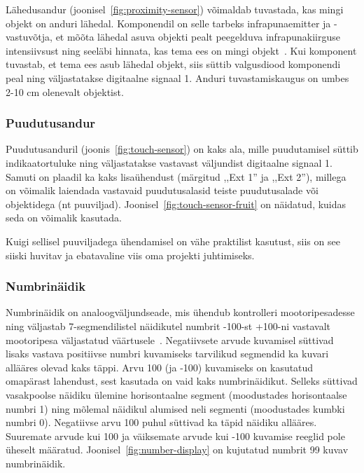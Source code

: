 \documentclass[12pt]{article}
\begin{document}
Lähedusandur (joonisel~\ref{fig:proximity-sensor}) võimaldab tuvastada, kas mingi objekt on anduri lähedal. Komponendil on selle tarbeks infrapunaemitter ja -vastuvõtja, et mõõta lähedal asuva objekti pealt peegelduva infrapunakiirguse intensiivsust ning seeläbi hinnata, kas tema ees on mingi objekt~\cite{ProximitySensorCrumbDigitalInputforCrumbleController}. Kui komponent tuvastab, et tema ees asub lähedal objekt, siis süttib valgusdiood komponendi peal ning väljastatakse digitaalne signaal 1. Anduri tuvastamiskaugus on umbes 2-10 cm olenevalt objektist.

\subsubsection{Puudutusandur}


Puudutusanduril (joonis~\ref{fig:touch-sensor}) on kaks ala, mille puudutamisel süttib indikaatortuluke ning väljastatakse vastavast väljundist digitaalne signaal 1. Samuti on plaadil ka kaks lisaühendust (märgitud ,,Ext 1'' ja ,,Ext 2''), millega on võimalik laiendada vastavaid puudutusalasid teiste puudutusalade või objektidega (nt puuviljad). Joonisel~\ref{fig:touch-sensor-fruit} on näidatud, kuidas seda on võimalik kasutada.


Kuigi sellisel puuviljadega ühendamisel on vähe praktilist kasutust, siis on see siiski huvitav ja ebatavaline viis oma projekti juhtimiseks.

\subsubsection{Numbrinäidik}


Numbrinäidik on analoogväljundseade, mis ühendub kontrolleri mootoripesadesse ning väljastab 7-segmendilistel näidikutel numbrit -100-st +100-ni vastavalt mootoripesa väljastatud väärtusele~\cite{NumberDisplayCrumbforCrumbleController}. Negatiivsete arvude kuvamisel süttivad lisaks vastava positiivse numbri kuvamiseks tarvilikud segmendid ka kuvari allääres olevad kaks täppi. Arvu 100 (ja -100) kuvamiseks on kasutatud omapärast lahendust, sest kasutada on vaid kaks numbrinäidikut. Selleks süttivad vasakpoolse näidiku ülemine horisontaalne segment (moodustades horisontaalse numbri 1) ning mõlemal näidikul alumised neli segmenti (moodustades kumbki numbri 0). Negatiivse arvu 100 puhul süttivad ka täpid näidiku allääres. Suuremate arvude kui 100 ja väiksemate arvude kui -100 kuvamise reeglid pole üheselt määratud. Joonisel~\ref{fig:number-display} on kujutatud numbrit 99 kuvav numbrinäidik.
\end{document}
